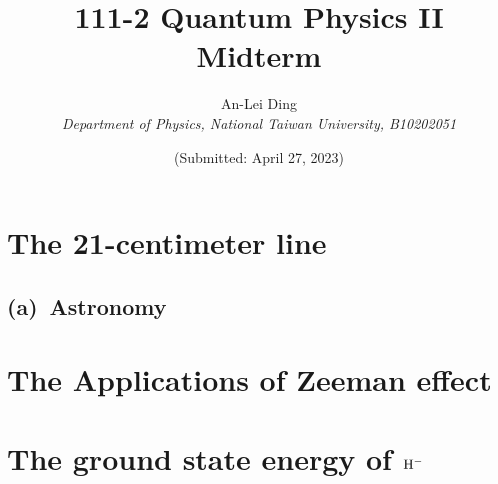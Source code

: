 \documentclass{article}
\title{\textbf{111-2 Quantum Physics II Midterm}}
\author{An-Lei Ding\\\textit{Department of Physics, National Taiwan University, B10202051}}
\date{(Submitted: April 27, 2023)}
\begin{document}
\maketitle

\section{The 21-centimeter line}

\subsection*{(a)\ Astronomy}

\section{The Applications of Zeeman effect}

\section{The ground state energy of ${\rm H^{-}}$}

% 
% 
\end{document}
